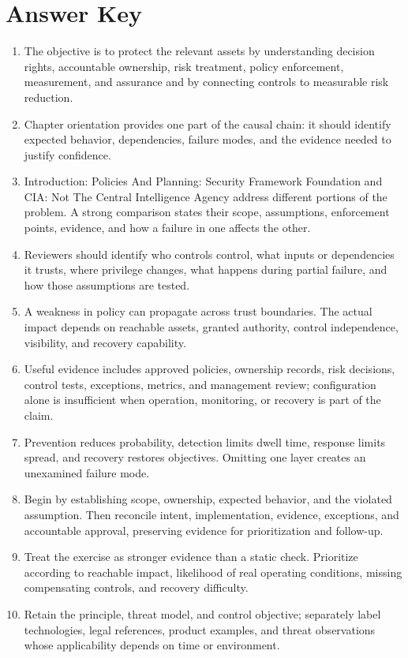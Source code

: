 \documentclass[11pt,letterpaper]{article}
\begin{document}
\section*{Answer Key}
\begin{enumerate}
\item The objective is to protect the relevant assets by understanding decision rights, accountable ownership, risk treatment, policy enforcement, measurement, and assurance and by connecting controls to measurable risk reduction.
\item Chapter orientation provides one part of the causal chain: it should identify expected behavior, dependencies, failure modes, and the evidence needed to justify confidence.
\item Introduction: Policies And Planning: Security Framework Foundation and CIA: Not The Central Intelligence Agency address different portions of the problem. A strong comparison states their scope, assumptions, enforcement points, evidence, and how a failure in one affects the other.
\item Reviewers should identify who controls control, what inputs or dependencies it trusts, where privilege changes, what happens during partial failure, and how those assumptions are tested.
\item A weakness in policy can propagate across trust boundaries. The actual impact depends on reachable assets, granted authority, control independence, visibility, and recovery capability.
\item Useful evidence includes approved policies, ownership records, risk decisions, control tests, exceptions, metrics, and management review; configuration alone is insufficient when operation, monitoring, or recovery is part of the claim.
\item Prevention reduces probability, detection limits dwell time, response limits spread, and recovery restores objectives. Omitting one layer creates an unexamined failure mode.
\item Begin by establishing scope, ownership, expected behavior, and the violated assumption. Then reconcile intent, implementation, evidence, exceptions, and accountable approval, preserving evidence for prioritization and follow-up.
\item Treat the exercise as stronger evidence than a static check. Prioritize according to reachable impact, likelihood of real operating conditions, missing compensating controls, and recovery difficulty.
\item Retain the principle, threat model, and control objective; separately label technologies, legal references, product examples, and threat observations whose applicability depends on time or environment.
\end{enumerate}
\end{document}
